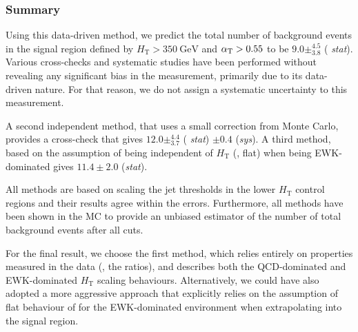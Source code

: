 \subsubsection{Summary}

Using this data-driven method, we predict the total number of
background events in the signal region defined by $H_{\mathrm{T}} >
350~\mathrm{GeV}$ and $\alpha_{\mathrm{T}} > 0.55$ to be $9.0\pm^{4.5}_{3.8}$ ({\it
  stat}). Various cross-checks and systematic studies have been
performed without revealing any significant bias in the measurement,
primarily due to its data-driven nature. For that reason, we do not
assign a systematic uncertainty to this measurement.

A second independent method, that uses a small correction from Monte
Carlo, provides a cross-check that gives $12.0\pm^{4.4}_{3.7}$ ({\it
  stat}) $\pm 0.4$ ({\it sys}). A third method, based on the
assumption of \RaT being independent of $H_{\mathrm{T}}$ (\ie, flat)
when being EWK-dominated gives $11.4\pm2.0$ ({\it stat}).

All methods are based on scaling the jet \pt thresholds in the lower
$H_{\mathrm{T}}$ control regions and their results agree within the
errors.  Furthermore, all methods have been shown in the MC to provide
an unbiased estimator of the number of total background events after
all cuts. 

For the final result, we choose the first method, which relies
entirely on properties measured in the data (\ie, the ratios), and
describes both the QCD-dominated and EWK-dominated $H_{\mathrm{T}}$
scaling behaviours. Alternatively, we could have also adopted a more
aggressive approach that explicitly relies on the assumption of
flat behaviour of \RaT for the EWK-dominated environment when
extrapolating into the signal region.


